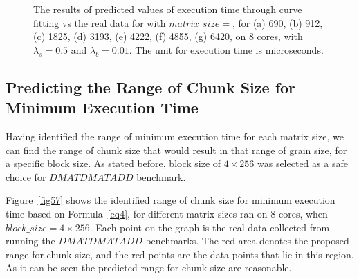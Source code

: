 \begin{figure}[H]
{	\label{fig56:g}}
	\caption{The results of predicted values of execution time through curve fitting vs the real data for with $matrix\_size=$, for (a) 690, (b) 912, (c) 1825, (d) 3193, (e) 4222, (f) 4855, (g) 6420, on 8 cores, with $\lambda_{s}=0.5$ and $\lambda_{b}=0.01$. The unit for execution time is microseconds.}
	\label{fig56}	
\end{figure}


\subsection{Predicting the Range of Chunk Size for Minimum Execution Time}
Having identified the range of minimum execution time for each matrix size, we can find the range of chunk size that would result in that range of grain size, for a specific block size.
As stated before, block size of $4\times{256}$ was selected as a safe choice for $DMATDMATADD$ benchmark. 


Figure~\ref{fig57} shows the identified range of chunk size for minimum execution time based on Formula~\ref{eq4}, for different matrix sizes ran on 8 cores, when $block\_{size}=4\times{256}$. Each point on the graph is the real data collected from running the $DMATDMATADD$ benchmarks. The red area denotes the proposed range for chunk size, and the red points are the data points that lie in this region. As it can be seen the predicted range for chunk size are reasonable.   

